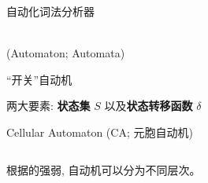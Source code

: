 
\begin{frame}{}
  \begin{center}
    自动化词法分析器
  \end{center}
\end{frame}

\begin{frame}{}
  \begin{center}
     \\[5pt]
    (Automaton; Automata)

    \vspace{-0.30cm}
    ``开关''自动机

    \vspace{0.80cm}
    两大要素: {\bf 状态集} $S$ 以及{\bf 状态转移函数} $\delta$
  \end{center}
\end{frame}

\begin{frame}{}
  \begin{center}
    Cellular Automaton (CA; 元胞自动机)
  \end{center}

  \begin{columns}
  \end{columns}
\end{frame}

\begin{frame}{}
  \begin{center}

    \vspace{0.50cm}
    根据的强弱, 自动机可以分为不同层次。
  \end{center}
\end{frame}

\begin{frame}{}
  \begin{center}

    \vspace{0.30cm}

    \vspace{0.50cm}
  \end{center}
\end{frame}
